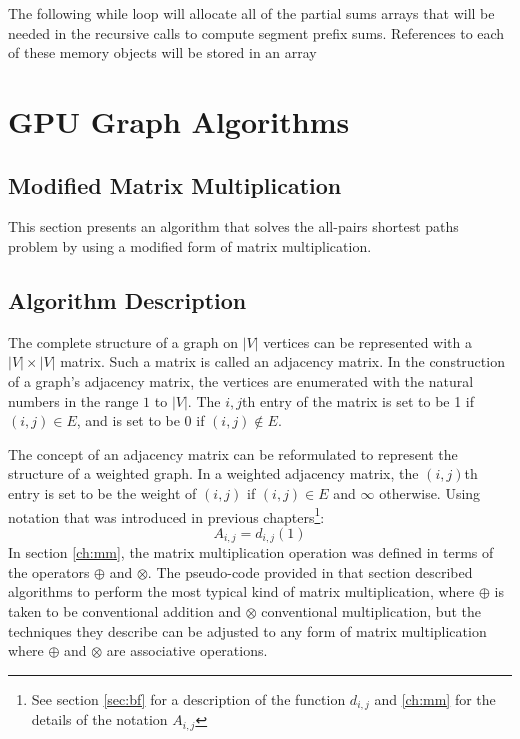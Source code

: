 \documentclass[12pt,twoside]{reedthesis}
\begin{document}
The following while loop will allocate all of the partial sums arrays that will be needed in the recursive calls to compute segment prefix sums. References to each of these memory objects will be stored in an array

\chapter{GPU Graph Algorithms}

\section{Modified Matrix Multiplication}

This section presents an algorithm that solves the all-pairs shortest paths problem by using a modified form of matrix multiplication.

\section{Algorithm Description}

The complete structure of a graph on $|V|$ vertices can be represented with a $|V| \times |V|$ matrix. Such a matrix is called an adjacency matrix. In the construction of a graph's adjacency matrix, the vertices are enumerated with the natural numbers in the range $1$ to $|V|$. The $i,j$th entry of the matrix is set to be 1 if $(i,j) \in E$, and is set to be 0 if $(i,j) \not \in E$.

The concept of an adjacency matrix can be reformulated to represent the structure of a weighted graph. In a weighted adjacency matrix, the $(i,j)$th entry is set to be the weight of $(i,j)$ if $(i,j) \in E$ and $\infty$ otherwise. Using notation that was introduced in previous chapters\footnote{See section \ref{sec:bf} for a description of the function $d_{i,j}$ and \ref{ch:mm} for the details of the notation $A_{i,j}$}:
\begin{equation}
\label{eq:ajmdef}
A_{i,j} = d_{i,j}(1)
\end{equation}
In section \ref{ch:mm}, the matrix multiplication operation was defined in terms of the operators $\oplus$ and $\otimes$. The pseudo-code provided in that section described algorithms to perform the most typical kind of matrix multiplication, where $\oplus$ is taken to be conventional addition and $\otimes$ conventional multiplication, but the techniques they describe can be adjusted to any form of matrix multiplication where $\oplus$ and $\otimes$ are associative operations.
\end{document}
